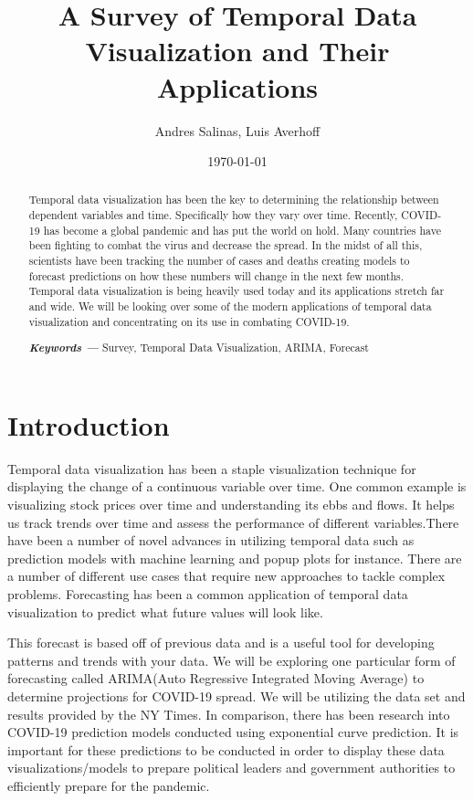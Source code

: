 \documentclass[twocolumn]{article}
\title{\textbf{A Survey of Temporal Data Visualization and Their Applications}}
\author{Andres Salinas, Luis Averhoff}
\affil{Florida International University}
\date{\today}
\providecommand{\keywords}[1]
{
  \small	
  \textbf{\textit{Keywords ---}} #1
}
\begin{document}
	\maketitle
	
	\begin{abstract}
		Temporal data visualization has been the key to determining the relationship between dependent variables and time. Specifically how they vary over time. Recently, COVID-19 has become a global pandemic and has put the world on hold. Many countries have been fighting to combat the virus and decrease the spread. In the midst of all this, scientists have been tracking the number of cases and deaths creating models to forecast predictions on how these numbers will change in the next few months. Temporal data visualization is being heavily used today and its applications stretch far and wide. We will be looking over some of the modern applications of temporal data visualization and concentrating on its use in combating COVID-19. \newline
		
		\keywords{Survey, Temporal Data Visualization, ARIMA, Forecast}
	\end{abstract}
	
	\vspace*{-\baselineskip}

	\section{Introduction}
	    Temporal data visualization has been a staple visualization technique for displaying the change of a continuous variable over time. One common example is visualizing stock prices over time and understanding its ebbs and flows. It helps us track trends over time and assess the performance of different variables.There have been a number of novel advances in utilizing temporal data such as prediction models with machine learning and popup plots for instance. There are a number of different use cases that require new approaches to tackle complex problems. Forecasting has been a common application of temporal data visualization to predict what future values will look like. 
	    
	    This forecast is based off of previous data and is a useful tool for developing patterns and trends with your data. We will be exploring one particular form of forecasting called ARIMA(Auto Regressive Integrated Moving Average) to determine projections for COVID-19 spread. We will be utilizing the data set and results provided by the NY Times. In comparison, there has been research into COVID-19 prediction models conducted using exponential curve prediction. It is important for these predictions to be conducted in order to display these data visualizations/models to prepare political leaders and government authorities to efficiently prepare for the pandemic.\cite{what-next}
	
\end{document}
